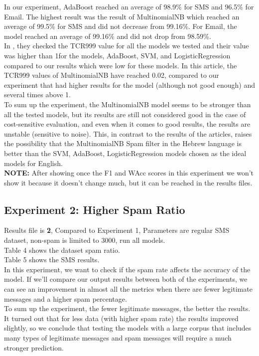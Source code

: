 \documentclass[11pt,a4paper]{article}
\begin{document}
In our experiment, AdaBoost reached an average of 98.9\% for SMS and 96.5\% for Email. The highest result was the result of MultinomialNB which reached an average of 99.5\% for SMS and did not decrease from 99.16\%. For Email, the model reached an average of 99.16\% and did not drop from 98.59\%.\\
In \citep{andrew2007scalable}, they checked the TCR999 value for all the models we tested and their value was higher than 1for the models, AdaBoost, SVM, and LogisticRegression compared to our results which were low for these models. In this article, the TCR999 values of MultinomialNB have reached 0.02, compared to our experiment that had higher results for the model (although not good enough) and several times above 1.\\
To sum up the experiment, the MultinomialNB model seems to be stronger than all the tested models, but its results are still not considered good in the case of cost-sensitive evaluation, and even when it comes to good results, the results are unstable (sensitive to noise).
This, in contrast to the results of the articles, raises the possibility that the MultinomialNB Spam filter in the Hebrew language is better than the SVM, AdaBoost, LogisticRegression models chosen as the ideal models for English.\\
\textbf{NOTE:} After showing once the F1 and WAcc scores in this experiment we won't show it because it doesn't change much, but it can be reached in the results files.

\subsection{Experiment 2: Higher Spam Ratio}
\label{ssec:Experiment 2}
Results file is \textbf{2}, Compared to Experiment 1, Parameters are regular SMS dataset, non-spam is limited to 3000, run all models.\\
Table 4 shows the dataset spam ratio.\\
Table 5 shows the SMS results.\\
In this experiment, we want to check if the spam rate affects the accuracy of the model. If we'll compare our output results between both of the experiments, we can see an improvement in almost all the metrics when there are fewer legitimate messages and a higher spam percentage.\\
To sum up the experiment, the fewer legitimate messages, the better the results. It turned out that for less data (with higher spam rate) the results improved slightly, so we conclude that testing the models with a large corpus that includes many types of legitimate messages and spam messages will require a much stronger prediction.
\end{document}
